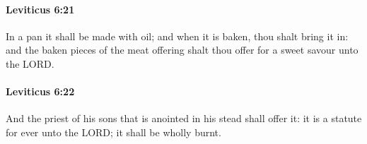 		\paragraph{Leviticus 6:21} %
			\label{LEVITICUS-6-21}

			In a pan it shall be made with oil; and when it is baken, thou shalt bring it in: and the baken pieces of the meat offering shalt thou offer for a sweet savour unto the LORD.


		\paragraph{Leviticus 6:22} %
			\label{LEVITICUS-6-22}

			And the priest of his sons that is anointed in his stead shall offer it: it is a statute for ever unto the LORD; it shall be wholly burnt.


